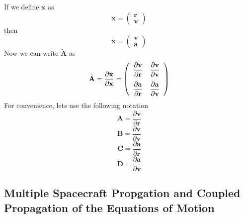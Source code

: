 If we define $\mathbf{x}$ as
%
\begin{equation}
     \mathbf{x} = \left(\begin{array}{cc}
                 \mathbf{r}\\
                 \mathbf{v}
          \end{array}\right)
\end{equation}
%
then
%
%
\begin{equation}
     \dot{\mathbf{x}} = \left(\begin{array}{cc}
                 \mathbf{v}\\
                 \mathbf{a}
          \end{array}\right)
\end{equation}
%
Now we can write $\tilde{\mathbf{A}}$ as
%
\begin{equation}
     \tilde{\mathbf{A}} = \frac{\partial \dot{\mathbf{x}}}{\partial
     \mathbf{x}}=
     \left(\begin{array}{ccc}
              \displaystyle\frac{\partial \mathbf{v}}{\partial \mathbf{r}} & \displaystyle\frac{\partial \mathbf{v}}{\partial
              \mathbf{v}}\vspace{.1 in}\\
              \displaystyle\frac{\partial \mathbf{a}}{\partial \mathbf{r}} & \displaystyle\frac{\partial \mathbf{a}}{\partial
              \mathbf{v}}
     \end{array}\right)
\end{equation}
%
For convenience, lets use the following notation
%
\begin{equation}
    \mathbf{A} = \displaystyle\frac{\partial \mathbf{v}}{\partial \mathbf{r}}
\end{equation}
%
\begin{equation}
    \mathbf{B} = \displaystyle\frac{\partial \mathbf{v}}{\partial
              \mathbf{v}}
\end{equation}
%
\begin{equation}
    \mathbf{C} = \displaystyle\frac{\partial \mathbf{a}}{\partial \mathbf{r}}
\end{equation}
%
\begin{equation}
    \mathbf{D} = \displaystyle\frac{\partial \mathbf{a}}{\partial \mathbf{v}}
\end{equation}

\subsection{Multiple Spacecraft Propgation and Coupled Propagation of the Equations of Motion}

